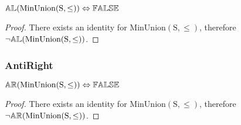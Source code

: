 \documentclass[../Summary.tex]{subfiles}
\begin{document}
\begin{theorem} \label{thm:minunion_al}
${\mathbb{AL}}(\mathrm{MinUnion(S,\leq)}) \Leftrightarrow {\mathbb{FALSE}}$
\end{theorem}


\begin{proof}
There exists an identity for $\mathrm{MinUnion(S,\leq)}$, therefore $\neg {\mathbb{AL}}(\mathrm{MinUnion(S,\leq)})$.
\end{proof}





\subsubsection{AntiRight}

\begin{theorem} \label{thm:minunion_ar}
${\mathbb{AR}}(\mathrm{MinUnion(S,\leq)}) \Leftrightarrow {\mathbb{FALSE}}$
\end{theorem}

\begin{proof}
There exists an identity for $\mathrm{MinUnion(S,\leq)}$, therefore $\neg {\mathbb{AR}}(\mathrm{MinUnion(S,\leq)})$.
\end{proof}
\end{document}
